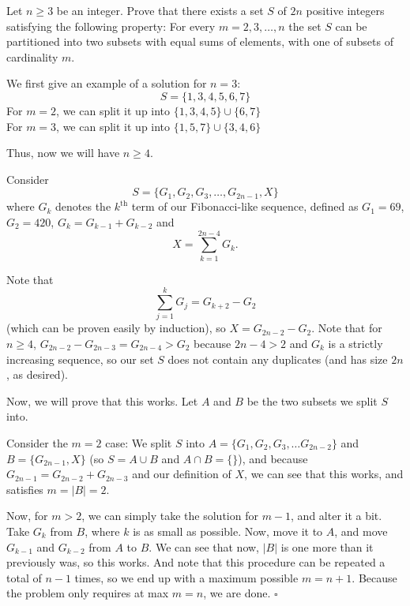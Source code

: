 
\begin{problem}[ISL 2018 C1]
    Let $n\geqslant 3$ be an integer. Prove that there exists a set $S$ of $2n$
    positive integers satisfying the following property: For every $m=2,3,\ldots,n$
    the set $S$ can be partitioned into two subsets with equal sums of elements,
    with one of subsets of cardinality $m$.
\end{problem}

\begin{solution}[Ritwin]
    We first give an example of a solution for $n=3$:
    \[S = \{1, 3, 4, 5, 6, 7\}\]
    For $m=2$, we can split it up into $\{1,3,4,5\} \cup \{6,7\}$\\
    For $m=3$, we can split it up into $\{1,5,7\} \cup \{3,4,6\}$
    
    Thus, now we will have $n \geq 4$.
    
    Consider \[S = \{G_1, G_2, G_3, \ldots, G_{2n-1}, X\}\] where $G_k$ denotes
    the $k^\textrm{th}$ term of our Fibonacci-like sequence, defined as
    $G_1 = 69$, $G_2 = 420$, $G_k = G_{k-1} + G_{k-2}$ and \[X = \sum_{k=1}^{2n-4} G_k.\]
    
    Note that \[\sum_{j=1}^k G_j = G_{k+2} - G_2\] (which can be proven easily
    by induction), so $X = G_{2n-2} - G_2$. Note that for $n \geq 4$,
    $G_{2n-2} - G_{2n-3} = G_{2n-4} > G_2$ because $2n-4 > 2$ and $G_k$ is a
    strictly increasing sequence, so our set $S$ does not contain any duplicates
    (and has size $2n$, as desired).
    
    Now, we will prove that this works. Let $A$ and $B$ be the two subsets we split $S$ into.
    
    Consider the $m=2$ case: We split $S$ into $A = \{G_1, G_2, G_3, \ldots G_{2n-2}\}$
    and $B = \{G_{2n-1}, X\}$ (so $S = A \cup B$ and $A \cap B = \{\}$), and
    because $G_{2n-1} = G_{2n-2} + G_{2n-3}$ and our definition of $X$, we can
    see that this works, and satisfies $m = |B| = 2$.
    
    Now, for $m > 2$, we can simply take the solution for $m-1$, and alter it a
    bit. Take $G_k$ from $B$, where $k$ is as small as possible. Now, move it to
    $A$, and move $G_{k-1}$ and $G_{k-2}$ from $A$ to $B$. We can see that now,
    $|B|$ is one more than it previously was, so this works. And note that this
    procedure can be repeated a total of $n-1$ times, so we end up with a maximum
    possible $m=n+1$. Because the problem only requires at max $m=n$, we are done. $\square$
\end{solution}

